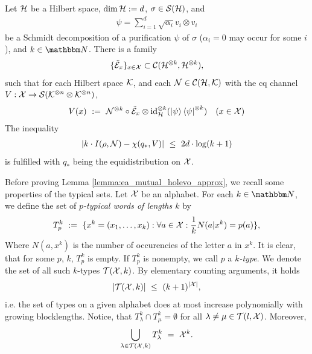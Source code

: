 \begin{lemma} \label{lemma:ea_mutual_holevo_approx}
 Let ${\mathcal H}$ be a Hilbert space, $\dim {\mathcal H} := d$, $\sigma \in {\mathcal S}({\mathcal H})$, and 
 \begin{align}
  \psi = \sum_{i=1}^d \sqrt{\alpha_i} v_i \otimes v_i
 \end{align}
 be a Schmidt decomposition of a purification $\psi$ of $\sigma$ ($\alpha_i = 0$ may occur for some $i$), and $k \in \bbmN$. There is a family 
 \begin{align}
  \{\tilde{{\mathcal E}}_x\}_{x \in {\mathcal X}} \subset {\mathcal C}({\mathcal H}^{\otimes k}, {\mathcal H}^{\otimes k}),
 \end{align}
 such that for each Hilbert space ${\mathcal K}$, and each ${\mathcal N} \in {\mathcal C}({\mathcal H}, {\mathcal K})$ with the cq channel $V: {\mathcal X} \rightarrow {\mathcal S}({\mathcal K}^{\otimes n} \otimes {\mathcal K}^{\otimes n})$,
 \begin{align}
  V(x) \ := \ {\mathcal N}^{\otimes k} \circ \tilde{{\mathcal E}}_x \otimes \mathrm{id}_{{\mathcal H}}^{\otimes k}(\ket{\psi}\bra{\psi}^{\otimes k}) &&(x \in {\mathcal X})
 \end{align}
 The inequality 
 \begin{align}
  \left|k \cdot I(\rho,{\mathcal N}) - \chi(q_\ast, V) \right| \ \leq \ 2 d \cdot \log(k+1) \label{lemma:ea_mutual_holevo_approx_1}
 \end{align}
 is fulfilled with $q_\ast$ being the equidistribution on ${\mathcal X}$.
\end{lemma}
Before proving Lemma \ref{lemma:ea_mutual_holevo_approx}, we recall some properties of the typical sets. 
Let ${\mathcal X}$ be an alphabet. For each $k \in \bbmN$, we define the set of \emph{$p$-typical words of lengths $k$} by 
\begin{align*}
T_p^k \ := \ \{x^k = (x_1,\dots,x_k): \forall a \in {\mathcal X}: \frac{1}{k}N(a|x^k) = p(a)\},
\end{align*}
Where $N(a,x^k)$ is the number of occurencies of the letter $a$ in $x^k$. 
It is clear, that for some $p$, $k$, $T_p^k$ is empty. If $T_p^k$ is nonempty, we call 
$p$ a \emph{$k$-type}. We denote the set of all such $k$-types ${\mathcal T}({\mathcal X},k)$. By elementary counting arguments, it holds 
\begin{align}
|{\mathcal T}({\mathcal X},k)| \ \leq \ (k+1)^{|{\mathcal X}|}, \label{type_counting}
\end{align}
i.e. the set of types on a given alphabet does at most increase polynomially with growing blocklengths.
Notice, that 
$
T_\lambda^k \cap T_\mu^k = \emptyset
$
for all $\lambda \neq \mu \in {\mathcal T}(l,{\mathcal X})$. Moreover, 
\begin{align}
\bigcup_{\lambda \in {\mathcal T}({\mathcal X},k)} T_\lambda^k \ = \ {\mathcal X}^k. \label{type_collection}
\end{align} 
